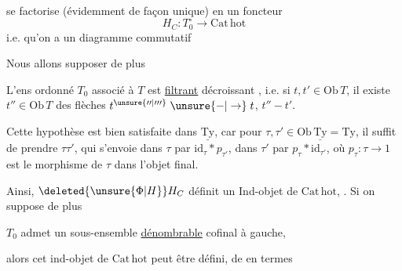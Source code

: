 
se factorise (évidemment de façon unique) en un foncteur
\[
H_C:T_0^\circ\longrightarrow\mathrm{Cat\,hot}
\]
i.e. qu'on a  un diagramme commutatif

Nous allons supposer de plus

L'ens ordonné $T_0$ associé à $T$ est \uline{filtrant} décroissant , i.e. si $t,t'\in\mathrm{Ob}\,T$, il existe $t''\in\mathrm{Ob}\,T$  des flèches $t^{\unsure{\prime\prime|\prime\prime\prime}}\mathrel{\unsure{-|\to}}t$, $t''\mathrel{-}t'$.

Cette hypothèse est bien satisfaite dans $\underline{\mathrm{Ty}}$, car pour $\tau,\tau'\in\mathrm{Ob}\,\underline{\mathrm{Ty}}=\mathrm{Ty}$, il suffit de prendre $\tau\tau'$, qui s'envoie dans $\tau$ par $\mathrm{id}_\tau*p_{\tau'}$, dans $\tau'$ par $p_\tau*\mathrm{id}_{\tau'}$, où $p_\tau:\tau\longrightarrow1$ est le morphisme de $\tau$ dans l'objet final. 

Ainsi, $\deleted{\unsure{\Phi|H}}H_C$ définit un Ind-objet de $\mathrm{Cat\,hot}$, . Si on suppose de plus

$T_0$ admet un sous-ensemble \uline{dénombrable} cofinal à gauche,

alors cet ind-objet de $\mathrm{Cat\,hot}$ peut être défini,   de \unsure{,} en termes


